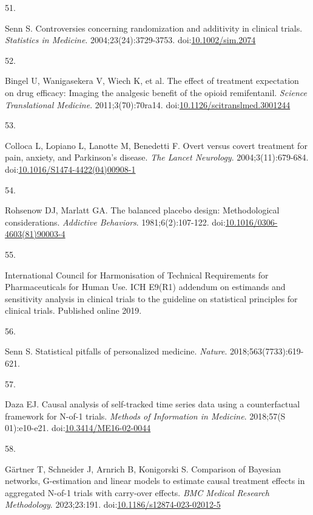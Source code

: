 \documentclass[
  11pt,
]{article}
\newlength{\cslhangindent}
\newlength{\csllabelwidth}
\newenvironment{CSLReferences}[2] %
 {\begin{list}{}{%
  \setlength{\itemindent}{0pt}
  \setlength{\leftmargin}{0pt}
  \setlength{\parsep}{0pt}
  \ifodd #1
   \setlength{\leftmargin}{\cslhangindent}
   \setlength{\itemindent}{-1\cslhangindent}
  \fi
  \setlength{\itemsep}{#2\baselineskip}}}
 {\end{list}}
\newcommand{\CSLLeftMargin}[1]{\parbox[t]{\csllabelwidth}{\strut#1\strut}}
\newcommand{\CSLRightInline}[1]{\parbox[t]{\linewidth - \csllabelwidth}{\strut#1\strut}}
\begin{document}
\begin{CSLReferences}{0}{1}
\CSLLeftMargin{51. }%
\CSLRightInline{Senn S. Controversies concerning randomization and additivity in clinical trials. \emph{Statistics in Medicine}. 2004;23(24):3729-3753. doi:\href{https://doi.org/10.1002/sim.2074}{10.1002/sim.2074}}

\CSLLeftMargin{52. }%
\CSLRightInline{Bingel U, Wanigasekera V, Wiech K, et al. The effect of treatment expectation on drug efficacy: Imaging the analgesic benefit of the opioid remifentanil. \emph{Science Translational Medicine}. 2011;3(70):70ra14. doi:\href{https://doi.org/10.1126/scitranslmed.3001244}{10.1126/scitranslmed.3001244}}

\CSLLeftMargin{53. }%
\CSLRightInline{Colloca L, Lopiano L, Lanotte M, Benedetti F. Overt versus covert treatment for pain, anxiety, and {Parkinson's} disease. \emph{The Lancet Neurology}. 2004;3(11):679-684. doi:\href{https://doi.org/10.1016/S1474-4422(04)00908-1}{10.1016/S1474-4422(04)00908-1}}

\CSLLeftMargin{54. }%
\CSLRightInline{Rohsenow DJ, Marlatt GA. The balanced placebo design: Methodological considerations. \emph{Addictive Behaviors}. 1981;6(2):107-122. doi:\href{https://doi.org/10.1016/0306-4603(81)90003-4}{10.1016/0306-4603(81)90003-4}}

\CSLLeftMargin{55. }%
\CSLRightInline{International Council for Harmonisation of Technical Requirements for Pharmaceuticals for Human Use. {ICH E9(R1)} addendum on estimands and sensitivity analysis in clinical trials to the guideline on statistical principles for clinical trials. Published online 2019.}

\CSLLeftMargin{56. }%
\CSLRightInline{Senn S. Statistical pitfalls of personalized medicine. \emph{Nature}. 2018;563(7733):619-621.}

\CSLLeftMargin{57. }%
\CSLRightInline{Daza EJ. Causal analysis of self-tracked time series data using a counterfactual framework for {N-of-1} trials. \emph{Methods of Information in Medicine}. 2018;57(S 01):e10-e21. doi:\href{https://doi.org/10.3414/ME16-02-0044}{10.3414/ME16-02-0044}}

\CSLLeftMargin{58. }%
\CSLRightInline{Gärtner T, Schneider J, Arnrich B, Konigorski S. Comparison of {Bayesian} networks, {G}-estimation and linear models to estimate causal treatment effects in aggregated {N-of-1} trials with carry-over effects. \emph{BMC Medical Research Methodology}. 2023;23:191. doi:\href{https://doi.org/10.1186/s12874-023-02012-5}{10.1186/s12874-023-02012-5}}


\end{CSLReferences}
\end{document}
